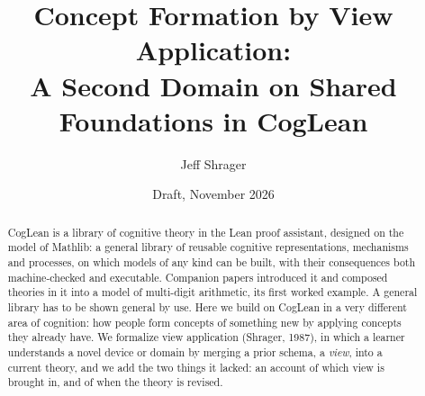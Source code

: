 \documentclass[11pt]{article}
\title{Concept Formation by View Application:\\A Second Domain on Shared Foundations in CogLean}
\author{Jeff Shrager}
\date{Draft, November 2026}
\begin{document}
\sloppy
\maketitle

\begin{center}
\end{center}
\medskip

\begin{abstract}
CogLean is a library of cognitive theory in the Lean proof assistant, designed on the model of Mathlib: a general library of reusable cognitive representations, mechanisms and processes, on which models of any kind can be built, with their consequences both machine-checked and executable. Companion papers introduced it and composed theories in it into a model of multi-digit arithmetic, its first worked example. A general library has to be shown general by use. Here we build on CogLean in a very different area of cognition: how people form concepts of something new by applying concepts they already have. We formalize view application (Shrager, 1987), in which a learner understands a novel device or domain by merging a prior schema, a \emph{view}, into a current theory, and we add the two things it lacked: an account of which view is brought in, and of when the theory is revised.


\end{abstract}
\end{document}
